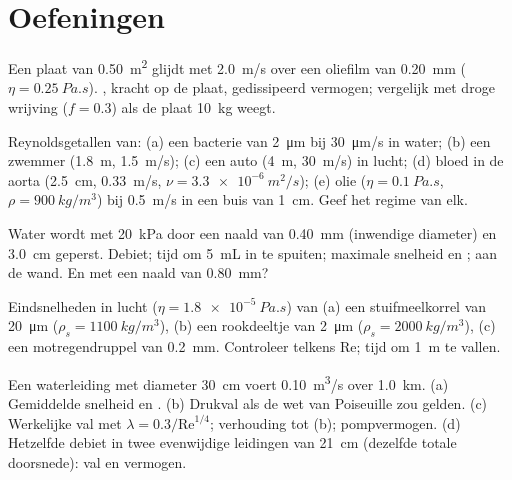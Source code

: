 \section{Oefeningen}

\begin{exercise}[$\star$]\label{exo:b2:viscous-flows:1}
Een plaat van \qty{0.50}{m^2} glijdt met \qty{2.0}{m/s} over een oliefilm
van \qty{0.20}{mm} ($\eta = \qty{0.25}{Pa.s}$). , kracht op de
plaat, gedissipeerd vermogen; vergelijk met droge wrijving ($f = 0.3$) als
de plaat \qty{10}{kg} weegt.
\end{exercise}

\begin{exercise}[$\star$]\label{exo:b2:viscous-flows:2}
Reynoldsgetallen van: (a) een bacterie van \qty{2}{\micro m} bij
\qty{30}{\micro m/s} in water; (b) een zwemmer (\qty{1.8}{m},
\qty{1.5}{m/s}); (c) een auto (\qty{4}{m}, \qty{30}{m/s}) in lucht; (d)
bloed in de aorta (\qty{2.5}{cm}, \qty{0.33}{m/s},
$\nu = \qty{3.3e-6}{m^2/s}$); (e) olie ($\eta = \qty{0.1}{Pa.s}$,
$\rho =
\qty{900}{kg/m^3}$) bij \qty{0.5}{m/s} in een buis van \qty{1}{cm}.
Geef het regime van elk.
\end{exercise}

\begin{exercise}[$\star$]\label{exo:b2:viscous-flows:3}
Water wordt met \qty{20}{kPa} door een naald van \qty{0.40}{mm} (inwendige
diameter) en \qty{3.0}{cm} geperst. Debiet; tijd om \qty{5}{mL} in te
spuiten; maximale snelheid en ;  aan de wand. En
met een naald van \qty{0.80}{mm}?
\end{exercise}

\begin{exercise}[$\star$]\label{exo:b2:viscous-flows:4}
Eindsnelheden in lucht ($\eta = \qty{1.8e-5}{Pa.s}$) van (a) een
stuifmeelkorrel van \qty{20}{\micro m} ($\rho_s = \qty{1100}{kg/m^3}$), (b)
een rookdeeltje van \qty{2}{\micro m} ($\rho_s = \qty{2000}{kg/m^3}$), (c)
een motregendruppel van \qty{0.2}{mm}. Controleer telkens $\mathrm{Re}$;
tijd om \qty{1}{m} te vallen.
\end{exercise}

\begin{exercise}[$\star\star$]\label{exo:b2:viscous-flows:5}
Een waterleiding met diameter \qty{30}{cm} voert \qty{0.10}{m^3/s} over
\qty{1.0}{km}. (a) Gemiddelde snelheid en . (b) Drukval als de
wet van Poiseuille zou gelden. (c) Werkelijke val met
$\lambda = 0.3/\mathrm{Re}^{1/4}$; verhouding tot (b); pompvermogen. (d)
Hetzelfde debiet in twee evenwijdige leidingen van \qty{21}{cm} (dezelfde
totale doorsnede): val en vermogen.
\end{exercise}

